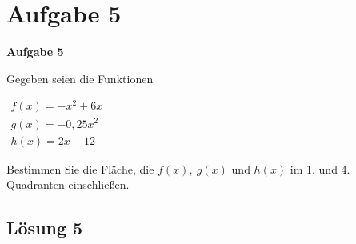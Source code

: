 \documentclass[main.tex]{subfiles}
\begin{document}
\section{Aufgabe 5}
\textbf{Aufgabe 5}

Gegeben seien die Funktionen

$ \begin{array}{l}
f( x) =-x^{2} +6x\\
g( x) =-0,25x^{2}\\
h( x) =2x-12
\end{array}$

Bestimmen Sie die Fläche, die $f( x) ,\ g( x)$ und $h( x)$ im 1. und 4. Quadranten einschließen.

\subsection{Lösung 5}
\end{document}
